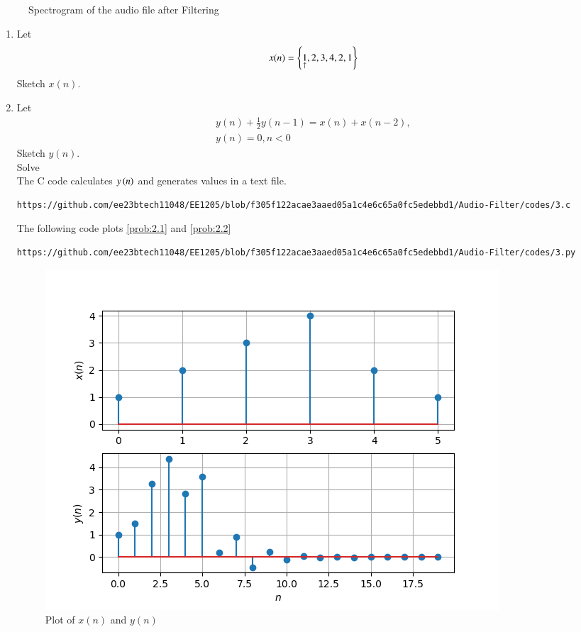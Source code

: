 \documentclass[journal,12pt,twocolumn]{IEEEtran}
\theoremstyle{remark}
\begin{document}
\begin{enumerate}[label=\thesection.\arabic*,ref=\thesection.\theenumi]
\begin{figure}[H]
    \caption{Spectrogram of the audio file after Filtering}
    \label{fig:after_filter_plot}
\end{figure}
\end{enumerate}
\begin{enumerate}[label=\thesection.\arabic*,ref=\thesection.\theenumi]
\section{Difference Equation}
\item Let
\begin{equation}
x(n) = \left\{\underset{\uparrow}{1},2,3,4,2,1\right\} \label{prob:2.1}
\end{equation}
Sketch $x(n)$. 
\item Let
\begin{multline}
y(n) + \frac{1}{2}y(n-1) = x(n) + x(n-2), 
\\
y(n) = 0, n < 0 \label{prob:2.2}
\end{multline}
Sketch $y(n)$.\\
Solve\\
\solution  The C code calculates $y\left(n\right)$  and generates values in a text file.
\begin{lstlisting}
https://github.com/ee23btech11048/EE1205/blob/f305f122acae3aaed05a1c4e6c65a0fc5edebbd1/Audio-Filter/codes/3.c
\end{lstlisting} 
The following code plots \eqref{prob:2.1} and \eqref{prob:2.2}
\begin{lstlisting}
https://github.com/ee23btech11048/EE1205/blob/f305f122acae3aaed05a1c4e6c65a0fc5edebbd1/Audio-Filter/codes/3.py
\end{lstlisting}

\begin{figure}[H]
	\centering
	\includegraphics[width=\columnwidth]{figs/Plot_xn_yn.png}
	\caption{Plot of $x(n)$ and $y(n)$}
	\label{fig:xnyn}
\end{figure}
\end{enumerate}
\end{document}
